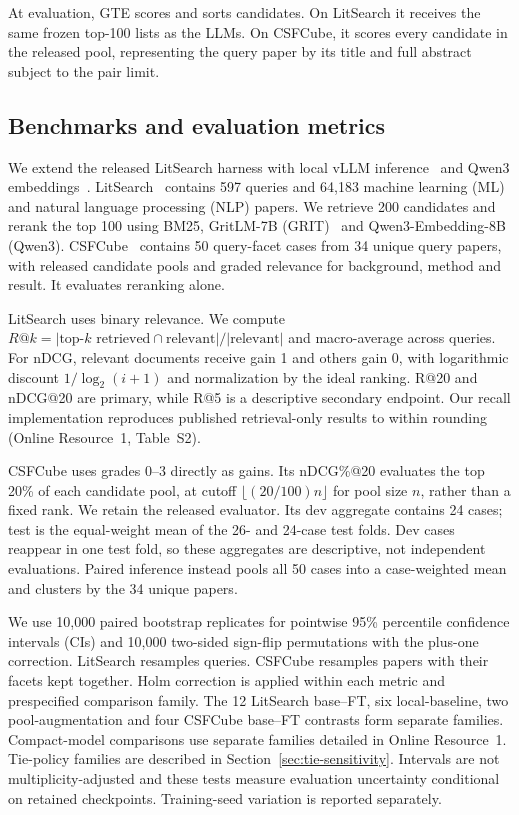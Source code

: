 \documentclass[pdflatex,sn-basic,Numbered]{sn-jnl}%
\theoremstyle{thmstyleone}%
\theoremstyle{thmstyletwo}%
\theoremstyle{thmstylethree}%
\begin{document}
At evaluation, GTE scores and sorts candidates. On LitSearch it receives the
same frozen top-100 lists as the LLMs. On CSFCube, it scores every candidate in
the released pool, representing the query paper by its title and full abstract
subject to the pair limit.

\subsection{Benchmarks and evaluation metrics}
We extend the released LitSearch harness with local vLLM inference~\cite{Kwon}
and Qwen3 embeddings~\cite{Zhang}. LitSearch~\cite{Ajith} contains 597 queries
and 64,183 machine learning (ML) and natural language processing (NLP) papers. We retrieve 200 candidates and rerank the top 100
using BM25, GritLM-7B (GRIT)~\cite{gritlm} and Qwen3-Embedding-8B (Qwen3).
CSFCube~\cite{Mysore} contains 50 query-facet cases from 34 unique query papers,
with released candidate pools and graded relevance for background, method and
result. It evaluates reranking alone.

LitSearch uses binary relevance. We compute
\(R@k=|\text{top-}k\text{ retrieved}\cap\text{relevant}|/|\text{relevant}|\)
and macro-average across queries. For nDCG, relevant documents receive gain 1
and others gain 0, with logarithmic discount $1/\log_2(i+1)$ and normalization
by the ideal ranking. R@20 and nDCG@20 are primary, while R@5 is a descriptive
secondary endpoint. Our recall implementation reproduces published retrieval-only
results to within rounding (Online Resource~1, Table~S2).

CSFCube uses grades 0--3 directly as gains. Its nDCG\%@20 evaluates the top
20\% of each candidate pool, at cutoff $\lfloor(20/100)n\rfloor$ for pool size
$n$, rather than a fixed rank. We retain the released evaluator. Its dev aggregate
contains 24 cases; test is the equal-weight mean of the 26- and 24-case test
folds. Dev cases reappear in one test fold, so these aggregates are descriptive,
not independent evaluations. Paired inference instead pools all 50 cases into a
case-weighted mean and clusters by the 34 unique papers.

We use 10,000 paired bootstrap replicates for pointwise 95\% percentile confidence intervals (CIs)
and 10,000 two-sided sign-flip permutations with the plus-one correction.
LitSearch resamples queries. CSFCube resamples papers with their facets kept
together. Holm correction is applied within each metric and prespecified
comparison family. The 12 LitSearch base--FT, six local-baseline, two
pool-augmentation and four CSFCube base--FT contrasts form separate families.
Compact-model comparisons use separate families detailed in Online Resource~1.
Tie-policy families are described in Section~\ref{sec:tie-sensitivity}.
Intervals are not multiplicity-adjusted and these tests
measure evaluation uncertainty conditional on retained checkpoints. Training-seed
variation is reported separately.
\end{document}
